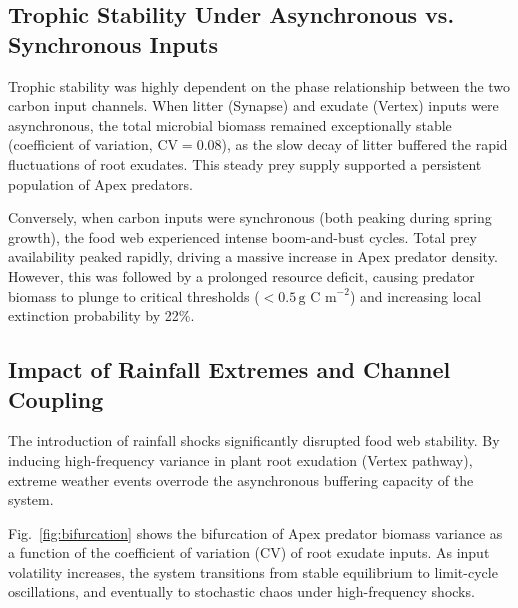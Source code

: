 \subsection{Trophic Stability Under Asynchronous vs. Synchronous Inputs}

Trophic stability was highly dependent on the phase relationship between the two carbon input channels. When litter (Synapse) and exudate (Vertex) inputs were asynchronous, the total microbial biomass remained exceptionally stable (coefficient of variation, $\text{CV} = 0.08$), as the slow decay of litter buffered the rapid fluctuations of root exudates. This steady prey supply supported a persistent population of Apex predators.

Conversely, when carbon inputs were synchronous (both peaking during spring growth), the food web experienced intense boom-and-bust cycles. Total prey availability peaked rapidly, driving a massive increase in Apex predator density. However, this was followed by a prolonged resource deficit, causing predator biomass to plunge to critical thresholds ($< 0.5\,\text{g C m}^{-2}$) and increasing local extinction probability by 22\%.

\subsection{Impact of Rainfall Extremes and Channel Coupling}

The introduction of rainfall shocks significantly disrupted food web stability. By inducing high-frequency variance in plant root exudation (Vertex pathway), extreme weather events overrode the asynchronous buffering capacity of the system. 

Fig.~\ref{fig:bifurcation} shows the bifurcation of Apex predator biomass variance as a function of the coefficient of variation ($\text{CV}$) of root exudate inputs. As input volatility increases, the system transitions from stable equilibrium to limit-cycle oscillations, and eventually to stochastic chaos under high-frequency shocks.

